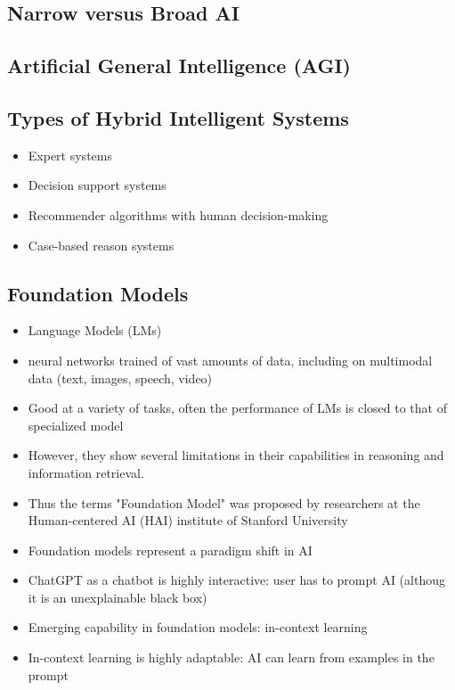 \subsection{Narrow versus Broad AI}

\subsection{Artificial General Intelligence (AGI)}



\subsection{Types of Hybrid Intelligent Systems}

\begin{itemize}
    \item Expert systems 
    \item Decision support systems
    \item Recommender algorithms with human decision-making
    \item Case-based reason systems
\end{itemize}


\subsection{Foundation Models}

\begin{itemize}
    \item Language Models (LMs)
    \item neural networks trained of vast amounts of data, including on multimodal data (text, images, speech, video)
    \item Good at a variety of tasks, often the performance of LMs is closed to that of specialized model
    \item However, they show several limitations in their capabilities in reasoning and information retrieval. 
    \item Thus the terms "Foundation Model" was proposed by researchers at the Human-centered AI (HAI) institute of Stanford University
\end{itemize}

\begin{itemize}
    \item Foundation models represent a paradigm shift in AI
    \item ChatGPT as a chatbot is highly interactive: user has to prompt AI (althoug it is an unexplainable black box)
    \item Emerging capability in foundation models: in-context learning 
    \item In-context learning is highly adaptable: AI can learn from examples in the prompt 
\end{itemize}

